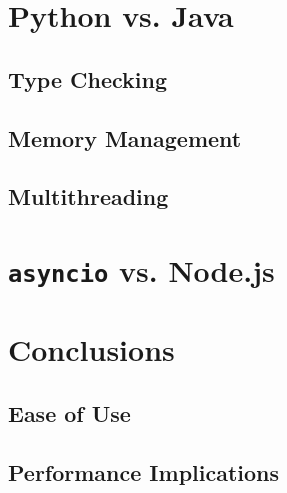 \section{Python vs. Java}
\par

\subsection{Type Checking}
\par

\subsection{Memory Management}
\par

\subsection{Multithreading}
\par

\section{\texttt{asyncio} vs. Node.js}
\par

\section{Conclusions}
\par

\subsection{Ease of Use}

\subsection{Performance Implications}

